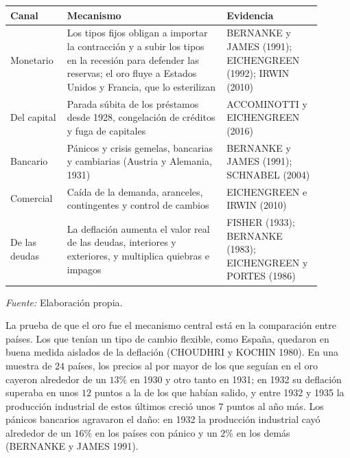 \documentclass[10pt,a4paper]{article}
\begin{document}
\begin{center}\begin{minipage}{\linewidth}\par\vspace{0.3em}
\begin{tabular}{|p{0.15\linewidth}|p{0.47\linewidth}|p{0.28\linewidth}|}
\hline
\textbf{Canal} & \textbf{Mecanismo} & \textbf{Evidencia} \\
\hline
Monetario & Los tipos fijos obligan a importar la contracción y a subir los tipos en la recesión para defender las reservas; el oro fluye a Estados Unidos y Francia, que lo esterilizan & BERNANKE y JAMES (1991); EICHENGREEN (1992); IRWIN (2010) \\
\hline
Del capital & Parada súbita de los préstamos desde 1928, congelación de créditos y fuga de capitales & ACCOMINOTTI y EICHENGREEN (2016) \\
\hline
Bancario & Pánicos y crisis gemelas, bancarias y cambiarias (Austria y Alemania, 1931) & BERNANKE y JAMES (1991); SCHNABEL (2004) \\
\hline
Comercial & Caída de la demanda, aranceles, contingentes y control de cambios & EICHENGREEN e IRWIN (2010) \\
\hline
De las deudas & La deflación aumenta el valor real de las deudas, interiores y exteriores, y multiplica quiebras e impagos & FISHER (1933); BERNANKE (1983); EICHENGREEN y PORTES (1986) \\
\hline
\end{tabular}\par\vspace{0.3em} {\small\textit{Fuente: }Elaboración propia.}\end{minipage}\end{center}

La prueba de que el oro fue el mecanismo central está en la comparación entre países. Los que tenían un tipo de cambio flexible, como España, quedaron en buena medida aislados de la deflación (CHOUDHRI y KOCHIN 1980). En una muestra de $24$ países, los precios al por mayor de los que seguían en el oro cayeron alrededor de un $13\%$ en 1930 y otro tanto en 1931; en 1932 su deflación superaba en unos $12$ puntos a la de los que habían salido, y entre 1932 y 1935 la producción industrial de estos últimos creció unos $7$ puntos al año más. Los pánicos bancarios agravaron el daño: en 1932 la producción industrial cayó alrededor de un $16\%$ en los países con pánico y un $2\%$ en los demás (BERNANKE y JAMES 1991).
\end{document}
